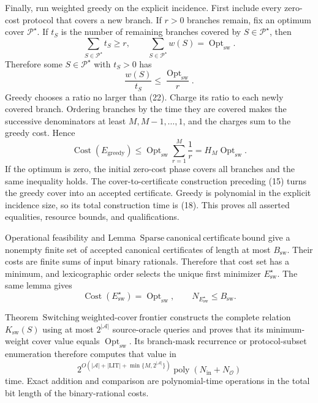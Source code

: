 Finally, run weighted greedy on the explicit incidence.  First include every zero-cost protocol that covers a new branch.  If \(r>0\) branches remain, fix an optimum cover \(\mathcal P^{\star}\).  If \(t_S\) is the number of remaining branches covered by \(S\in\mathcal P^{\star}\), then
\[
 \sum_{S\in\mathcal P^{\star}}t_S\geq r,
 \qquad
 \sum_{S\in\mathcal P^{\star}}w(S)=\operatorname{Opt}_{\mathrm{sw}}.
 \tag{21}
\]
Therefore some \(S\in\mathcal P^{\star}\) with \(t_S>0\) has
\[
 \frac{w(S)}{t_S}\leq\frac{\operatorname{Opt}_{\mathrm{sw}}}{r}.
 \tag{22}
\]
Greedy chooses a ratio no larger than (22).  Charge its ratio to each newly covered branch.  Ordering branches by the time they are covered makes the successive denominators at least \(M,M-1,\ldots,1\), and the charges sum to the greedy cost.  Hence
\[
 \operatorname{Cost}(E_{\mathrm{greedy}})
 \leq \operatorname{Opt}_{\mathrm{sw}}\sum_{r=1}^{M}\frac1r
 =H_M\operatorname{Opt}_{\mathrm{sw}}.
 \tag{23}
\]
If the optimum is zero, the initial zero-cost phase covers all branches and the same inequality holds.  The cover-to-certificate construction preceding (15) turns the greedy cover into an accepted certificate.  Greedy is polynomial in the explicit incidence size, so its total construction time is (18).  This proves all asserted equalities, resource bounds, and qualifications.

Operational feasibility and Lemma~\(\mathrm{Sparse\ canonical\ certificate\ bound}\) give a nonempty finite set of accepted canonical certificates of length at most \(B_{\mathrm{sw}}\).  Their costs are finite sums of input binary rationals.  Therefore that cost set has a minimum, and lexicographic order selects the unique first minimizer \(E_{\mathrm{sw}}^{\star}\).  The same lemma gives
\[
 \operatorname{Cost}(E_{\mathrm{sw}}^{\star})=\operatorname{Opt}_{\mathrm{sw}},
 \qquad
 N_{E_{\mathrm{sw}}^{\star}}\leq B_{\mathrm{sw}}.
 \tag{24}
\]

Theorem~\(\mathrm{Switching\ weighted\mbox{-}cover\ frontier}\) constructs the complete relation \(K_{\mathrm{sw}}(S)\) using at most \(2^{|\mathcal A|}\) source-oracle queries and proves that its minimum-weight cover value equals \(\operatorname{Opt}_{\mathrm{sw}}\).  Its branch-mask recurrence or protocol-subset enumeration therefore computes that value in
\[
 2^{O(|\mathcal A|+|\mathrm{LIT}|+\min\{M,2^{|\mathcal A|}\})}
 \operatorname{poly}(N_{\mathrm{in}}+N_{\mathcal O})
 \tag{25}
\]
time.  Exact addition and comparison are polynomial-time operations in the total bit length of the binary-rational costs.

